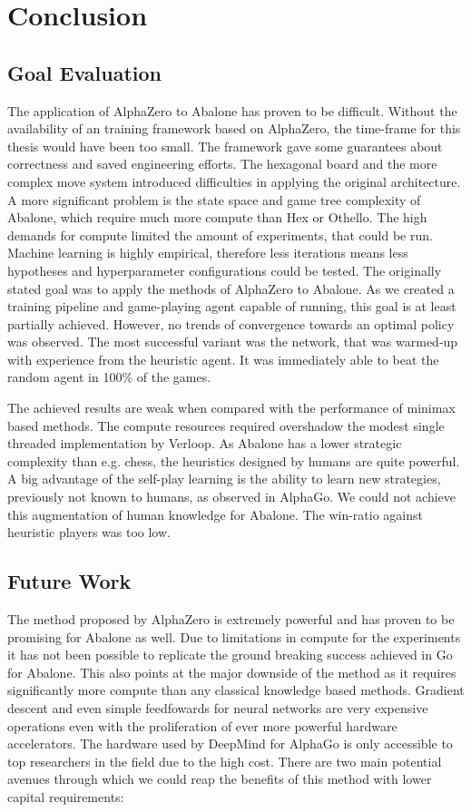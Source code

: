 \chapter{Conclusion}
\label{conclusion}

\section{Goal Evaluation}
The application of AlphaZero to Abalone has proven to be difficult. Without the availability of an training framework based on AlphaZero, the time-frame for this thesis would have been too small. The framework gave some guarantees about correctness and saved engineering efforts. The hexagonal board and the more complex move system introduced difficulties in applying the original architecture. A more significant problem is the state space and game tree complexity of Abalone, which require much more compute than Hex or Othello. The high demands for compute limited the amount of experiments, that could be run. Machine learning is highly empirical, therefore less iterations means less hypotheses and hyperparameter configurations could be tested. The originally stated goal was to apply the methods of AlphaZero to Abalone. As  we created a training pipeline and game-playing agent capable of running, this goal is at least partially achieved. However, no trends of convergence towards an optimal policy was observed. The most successful variant was the network, that was warmed-up with experience from the heuristic agent. It was immediately able to beat the random agent in 100\% of the games.

The achieved results are weak when compared with the performance of minimax based methods. The compute resources required overshadow the modest single threaded implementation by Verloop. As Abalone has a lower strategic complexity than e.g. chess, the heuristics designed by humans are quite powerful. A big advantage of the self-play learning is the ability to learn new strategies, previously not known to humans, as observed in AlphaGo. We could not achieve this augmentation of human knowledge for Abalone. The win-ratio against heuristic players was too low.

\section{Future Work}
The method proposed by AlphaZero is extremely powerful and has proven to be promising for Abalone as well. Due to limitations in compute for the experiments it has not been possible to replicate the ground breaking success achieved in Go for Abalone. This also points at the major downside of the method as it requires significantly more compute than any classical knowledge based methods. Gradient descent and even simple feedfowards for neural networks are very expensive operations even with the proliferation of ever more powerful hardware accelerators. The hardware used by DeepMind for AlphaGo is only accessible to top researchers in the field due to the high cost. There are two main potential avenues through which we could reap the benefits of this method with lower capital requirements:

